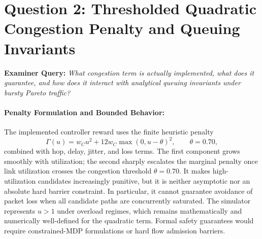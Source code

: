 \documentclass[12pt,a4paper,oneside]{report}
\begin{document}
\section{Question 2: Thresholded Quadratic Congestion Penalty and Queuing Invariants}
\textbf{Examiner Query:} \emph{What congestion term is actually implemented, what does it guarantee, and how does it interact with analytical queuing invariants under bursty Pareto traffic?}

\paragraph{Penalty Formulation and Bounded Behavior:}
The implemented controller reward uses the finite heuristic penalty
\begin{equation}
\Gamma(u)=w_Cu^2+12w_C\max(0,u-\theta)^2, \qquad \theta=0.70,
\end{equation}
combined with hop, delay, jitter, and loss terms. The first component grows smoothly with utilization; the second sharply escalates the marginal penalty once link utilization crosses the congestion threshold $\theta = 0.70$. It makes high-utilization candidates increasingly punitive, but it is neither asymptotic nor an absolute hard barrier constraint. In particular, it cannot guarantee avoidance of packet loss when all candidate paths are concurrently saturated. The simulator represents $u>1$ under overload regimes, which remains mathematically and numerically well-defined for the quadratic term. Formal safety guarantees would require constrained-MDP formulations or hard flow admission barriers.
\end{document}
